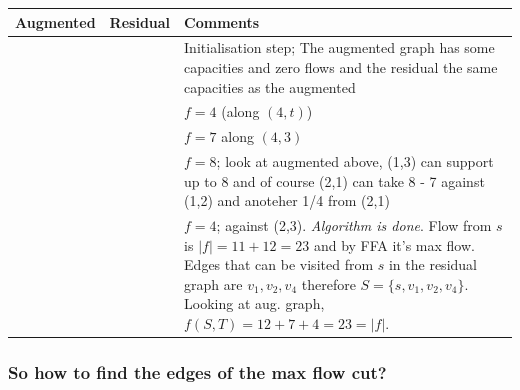 \documentclass[a4paper]{article}
\begin{document}

\begin{minipage}{\linewidth}
\begin{center}
\label{tab:ffa_step_by_step}
\begin{tabular}{| m{} | m{} | m{} |}
\hline   
    \textbf{Augmented} & \textbf{Residual} & \textbf{Comments}\\
\hline 
\hline 
     &
     &
    Initialisation step; The augmented graph has some capacities and zero flows and the residual the same capacities as the augmented\\
\hline 
     &
     &
    $f=4$ (along $(4,t)$)\\
\hline 
     &
     &
    $f=7$ along $(4,3)$\\
\hline 
     &
     &
    $f=8$; look at augmented above, (1,3) can support up to 8 and of course (2,1) can take 8 - 7 against (1,2) and anoteher 1/4 from (2,1)\\
\hline 
     &
     &
    $f=4$; against (2,3). \textit{Algorithm is done}. Flow from $s$ is $\left|f\right|=11+12=23$ and by FFA it's max flow. Edges that can be visited from $s$ in the residual graph are $v_1, v_2, v_4$ therefore $S=\{s,v_1, v_2,v_4\}$. Looking at aug. graph, $f(S,T) = 12+7+4=23=\left|f\right|$.\\
\hline 

\end{tabular}
\end{center}
\end{minipage}



\subsubsection{So how to find the edges of the max flow cut?}
\end{document}
